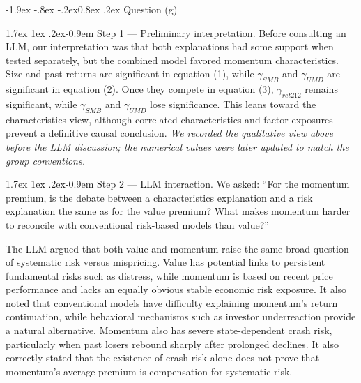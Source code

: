 \documentclass[11pt]{article}
\makeatletter
\renewcommand\subsubsection{\@startsection{subsubsection}{3}{0pt}%
  {-1.9ex \@plus -.8ex \@minus -.2ex}{0.8ex \@plus .2ex}%
  {\normalfont\bfseries\itshape\normalsize\color{psink}}}
\renewcommand\paragraph{\@startsection{paragraph}{4}{0pt}%
  {1.7ex \@plus 1ex \@minus .2ex}{-0.9em}%
  {\normalfont\bfseries\normalsize\color{psink}}}
\makeatother
\begin{document}
\subsubsection{Question (g)}

\paragraph{Step 1 --- Preliminary interpretation.} Before consulting an LLM, our
interpretation was that both explanations had some support when tested separately, but
the combined model favored momentum characteristics. Size and past returns are
significant in equation (1), while $\gamma_{SMB}$ and $\gamma_{UMD}$ are significant in
equation (2). Once they compete in equation (3), $\gamma_{ret212}$ remains significant,
while $\gamma_{SMB}$ and $\gamma_{UMD}$ lose significance. This leans toward the
characteristics view, although correlated characteristics and factor exposures prevent a
definitive causal conclusion. \emph{We recorded the qualitative view above before the LLM
discussion; the numerical values were later updated to match the group conventions.}

\paragraph{Step 2 --- LLM interaction.} We asked: ``For the momentum premium, is the
debate between a characteristics explanation and a risk explanation the same as for the
value premium? What makes momentum harder to reconcile with conventional risk-based
models than value?''

The LLM argued that both value and momentum raise the same broad question of systematic
risk versus mispricing. Value has potential links to persistent fundamental risks such as
distress, while momentum is based on recent price performance and lacks an equally
obvious stable economic risk exposure. It also noted that conventional models have
difficulty explaining momentum's return continuation, while behavioral mechanisms such as
investor underreaction provide a natural alternative. Momentum also has severe
state-dependent crash risk, particularly when past losers rebound sharply after prolonged
declines. It also correctly stated that the existence of crash risk alone does not prove
that momentum's average premium is compensation for systematic risk.
\end{document}
